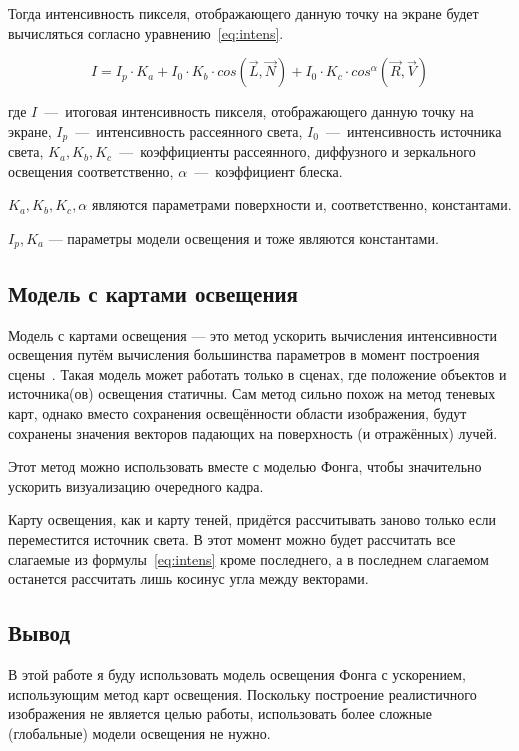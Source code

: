 Тогда интенсивность пикселя, отображающего данную точку на экране будет вычисляться согласно уравнению~\ref{eq:intens}.

\begin{equation}
    I = I_p \cdot K_a + I_0 \cdot K_b \cdot cos(\vec{L}, \vec{N}) + I_0 \cdot K_c \cdot cos^\alpha(\vec{R}, \vec{V})  
    \label{eq:intens}
\end{equation}

где $I$~---~итоговая интенсивность пикселя, отображающего данную точку на экране, $I_p$~---~интенсивность рассеянного света, $I_0$~---~интенсивность источника света, $K_a, K_b, K_c$~---~коэффициенты рассеянного, диффузного и зеркального освещения соответственно, $\alpha$~---~коэффициент блеска. 

$K_a, K_b, K_c, \alpha$ являются параметрами поверхности и, соответственно, константами. 

$I_p, K_a$ --- параметры модели освещения и тоже являются константами.

\subsection{Модель с картами освещения}

Модель с картами освещения --- это метод ускорить вычисления интенсивности освещения путём вычисления большинства параметров в момент построения сцены~\cite{LightMaps}. Такая модель может работать только в сценах, где положение объектов и источника(ов) освещения статичны. Сам метод сильно похож на метод теневых карт, однако вместо сохранения освещённости области изображения, будут сохранены значения векторов падающих на поверхность (и отражённых) лучей. 

Этот метод можно использовать вместе с моделью Фонга, чтобы значительно ускорить визуализацию очередного кадра.

Карту освещения, как и карту теней, придётся рассчитывать заново только если переместится источник света. В этот момент можно будет рассчитать все слагаемые из формулы~\ref{eq:intens} кроме последнего, а в последнем слагаемом останется рассчитать лишь косинус угла между векторами.

\subsection{Вывод}

В этой работе я буду использовать модель освещения Фонга с ускорением, использующим метод карт освещения. Поскольку построение реалистичного изображения не является целью работы, использовать более сложные (глобальные) модели освещения не нужно.